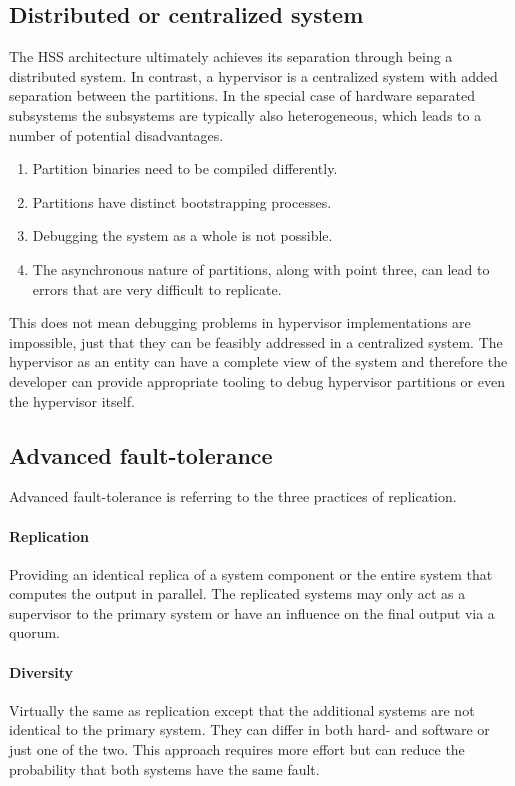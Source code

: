 \subsection{Distributed or centralized system} \label{distributed-or-centralized}
The \gls{HSS} architecture ultimately achieves its separation through being a distributed system. In contrast, a hypervisor is a centralized system with added separation between the partitions. In the special case of hardware separated subsystems the subsystems are typically also heterogeneous, which leads to a number of potential disadvantages.
\begin{enumerate}
\item Partition binaries need to be compiled differently.
\item Partitions have distinct bootstrapping processes.
\item Debugging the system as a whole is not possible.
\item The asynchronous nature of partitions, along with point three, can lead to errors that are very difficult to replicate.
\end{enumerate}
This does not mean debugging problems in hypervisor implementations are impossible, just that they can be feasibly addressed in a centralized system. The hypervisor as an entity can have a complete view of the system and therefore the developer can provide appropriate tooling to debug hypervisor partitions or even the hypervisor itself.

\subsection{Advanced fault-tolerance} \label{advanced-fault-tolerance}
Advanced fault-tolerance is referring to the three practices of replication.
\paragraph{Replication} Providing an identical replica of a system component or the entire system that computes the output in parallel. The replicated systems may only act as a supervisor to the primary system or have an influence on the final output via a quorum.
\paragraph{Diversity} Virtually the same as replication except that the additional systems are not identical to the primary system. They can differ in both hard- and software or just one of the two. This approach requires more effort but can reduce the probability that both systems have the same fault. 
